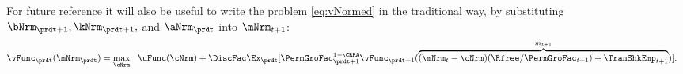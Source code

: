 \documentclass[\econtexRoot/SolvingMicroDSOPs]{subfiles}
\begin{document}
For future reference it will also be useful to write the problem \eqref{eq:vNormed} in the traditional way, by substituting ${\bNrm}_{\prdt+1},{\kNrm}_{\prdt+1},$ and ${\aNrm}_{\prdt}$ into ${\mNrm}_{t+1}$:
\begin{equation}\begin{gathered}\begin{aligned}
      \vFunc_{\prdt}({\mNrm}_{\prdt}) & = \max_{\cNrm} ~~ \uFunc(\cNrm)+ \DiscFac \Ex_{\prdt}[ \PermGroFac_{\prdt+1}^{1-\CRRA}\vFunc_{\prdt+1}(\overbrace{({\mNrm}_{t}-\cNrm)(\Rfree/\PermGroFac_{t+1})+\TranShkEmp_{t+1}}^{m_{t+1}})] \label{eq:vusual}.
    \end{aligned}\end{gathered}\end{equation}
\end{document}

